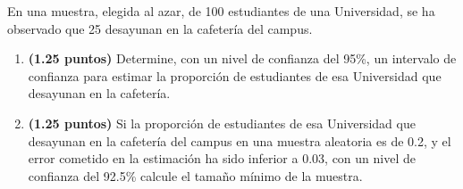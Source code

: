 
En una muestra, elegida al azar, de 100 estudiantes de una Universidad, se ha observado que 25 desayunan en la cafetería del campus.
\begin{enumerate}[label=\alph*)]
\item \textbf{(1.25 puntos)} Determine, con un nivel de confianza del 95\%, un intervalo de confianza para estimar la proporción de estudiantes de esa Universidad que desayunan en la cafetería.
\item \textbf{(1.25 puntos)} Si la proporción de estudiantes de esa Universidad que desayunan en la cafetería del campus en una muestra aleatoria es de 0.2, y el error cometido en la estimación ha sido inferior a 0.03, con un nivel de confianza del 92.5\% calcule el tamaño mínimo de la muestra.
\end{enumerate}
